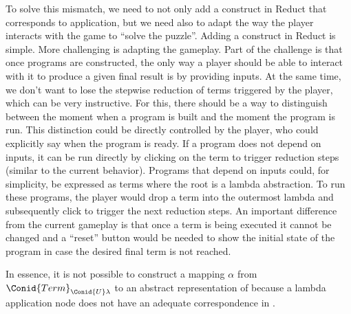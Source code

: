 To solve this mismatch,
we need to not only add a construct in Reduct that corresponds to application,
but we need also to adapt the way the player interacts with the game to ``solve the puzzle''.
% 
Adding a construct in Reduct is simple.
More challenging is adapting the gameplay.
Part of the challenge is that
once programs are constructed, the only way a player should be able to interact with it to produce a given final result is by providing inputs.
%
At the same time, we don't want to lose the stepwise reduction of terms triggered by the player, which can be very instructive.
%
For this, there should be a way to distinguish between the moment when a program is built and the moment the program is run.
This distinction could be directly controlled by the player, who could explicitly say when the program is ready.
If a program does not depend on inputs, it can be run directly by clicking on the term to trigger reduction steps (similar to the current behavior).
Programs that depend on inputs could, for simplicity, be expressed as terms where the root is a lambda abstraction.
To run these programs,
the player would drop a term into the outermost lambda and subsequently click to trigger the next reduction steps.
An important difference from the current gameplay is that once a term is being executed it cannot be changed and a ``reset'' button would be needed to show the initial state of the program in case the desired final term is not reached.

In essence,
it is not possible to construct a mapping $\alpha$ from
\ensuremath{\Conid{Term}_{\Conid{U}\lambda}}
to an abstract representation of 
because a lambda application node
does not have an adequate correspondence in .




